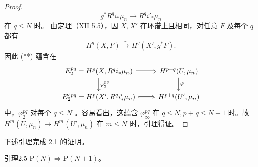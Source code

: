 \begin{proof}
\[g^*R^qi_*\mu_n\longrightarrow R^qi'_*\mu_n\tag{**}\]
在 $q\le N$ 时。
由定理（XII 5.5），因 $X,X'$ 在环谱上且相同，对任意 $F$ 及每个 $q$ 都有
\[H^q(X,F)\xrightarrow{\sim}H^q(X',g^*F).\]
因此 (**) 蕴含在
\[\begin{tikzcd}E_2^{pq}=H^p(X,R^qi_*\mu_n)\arrow[d,"\varphi_2^{pq}"]\arrow[r,Rightarrow]&H^{p+q}(U,\mu_n)\arrow[d,"\varphi"]\\E_2'{}^{pq}=H^p(X',R^qi'_*\mu_n)\arrow[r,Rightarrow]&H^{p+q}(U',\mu_n)\end{tikzcd}\]
中，$\varphi_2^{pq}$ 对每个 $q\le N$ 。容易看出，这蕴含 $\varphi_\infty^{pq}$ 在 $q\le N,p+q\le N+1$ 时。故 $H^m(U,\mu_n)\to H^m(U',\mu_n)$ 在 $m\le N$ 时，引理得证。
\end{proof}
下述引理完成 2.1 的证明。
\begin{SGAresult}{引理}{2.5}
$\mathrm P(N)\Rightarrow\mathrm P(N+1)$。
\end{SGAresult}
